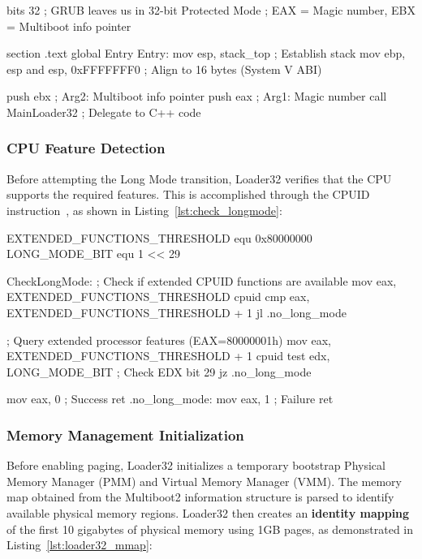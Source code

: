 \documentclass[a4paper,10pt,twoside]{report}
\theoremstyle{definition}
\begin{document}
\clearpage

\begin{nasmcode}[caption={Loader32 Entry Point (entry.nasm)}, label={lst:loader32_entry}]
bits 32
; GRUB leaves us in 32-bit Protected Mode
; EAX = Magic number, EBX = Multiboot info pointer

section .text
global Entry
Entry:
    mov esp, stack_top      ; Establish stack
    mov ebp, esp
    and esp, 0xFFFFFFF0     ; Align to 16 bytes (System V ABI)
    
    push ebx                ; Arg2: Multiboot info pointer
    push eax                ; Arg1: Magic number
    call MainLoader32       ; Delegate to C++ code
\end{nasmcode}

\subsubsection{CPU Feature Detection}

Before attempting the Long Mode transition, Loader32 verifies that the CPU supports the required features. This is accomplished through the CPUID instruction~\cite{Intel-CPUID}, as shown in Listing~\ref{lst:check_longmode}:

\begin{nasmcode}[caption={Long Mode Detection (checks.nasm)}, label={lst:check_longmode}]
EXTENDED_FUNCTIONS_THRESHOLD equ 0x80000000
LONG_MODE_BIT equ 1 << 29

CheckLongMode:
    ; Check if extended CPUID functions are available
    mov eax, EXTENDED_FUNCTIONS_THRESHOLD
    cpuid
    cmp eax, EXTENDED_FUNCTIONS_THRESHOLD + 1
    jl .no_long_mode
    
    ; Query extended processor features (EAX=80000001h)
    mov eax, EXTENDED_FUNCTIONS_THRESHOLD + 1
    cpuid
    test edx, LONG_MODE_BIT   ; Check EDX bit 29
    jz .no_long_mode
    
    mov eax, 0                ; Success
    ret
.no_long_mode:
    mov eax, 1                ; Failure
    ret
\end{nasmcode}

\subsubsection{Memory Management Initialization}

Before enabling paging, Loader32 initializes a temporary bootstrap Physical Memory Manager (PMM) and Virtual Memory Manager (VMM). The memory map obtained from the Multiboot2 information structure is parsed to identify available physical memory regions. Loader32 then creates an \textbf{identity mapping} of the first 10 gigabytes of physical memory using 1GB pages, as demonstrated in Listing~\ref{lst:loader32_mmap}:
\end{document}
